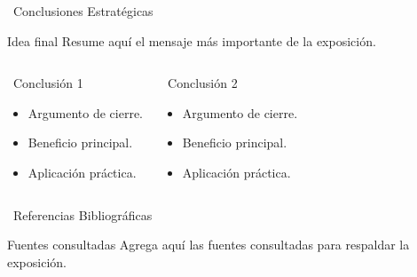 \documentclass[10pt, aspectratio=169]{beamer}
\begin{document}
\expositor{\Grupo}
\begin{frame}{\faCheckCircle \ Conclusiones Estratégicas}
  \begin{block}{Idea final}
    Resume aquí el mensaje más importante de la exposición.
  \end{block}

  \begin{columns}[T]
    \begin{exampleblock}{\faBullhorn \ Conclusión 1}
      \footnotesize
      \begin{itemize}
        \item Argumento de cierre.
        \item Beneficio principal.
        \item Aplicación práctica.
      \end{itemize}
    \end{exampleblock}

    \begin{exampleblock}{\faTools \ Conclusión 2}
      \footnotesize
      \begin{itemize}
        \item Argumento de cierre.
        \item Beneficio principal.
        \item Aplicación práctica.
      \end{itemize}
    \end{exampleblock}
  \end{columns}
\end{frame}

\expositor{\Grupo}
\begin{frame}{\faBook \ Referencias Bibliográficas}
  \begin{block}{Fuentes consultadas}
    \justifying
    \footnotesize
    Agrega aquí las fuentes consultadas para respaldar la exposición.
  \end{block}

  
\end{frame}

\end{document}
